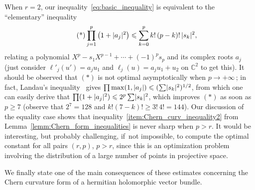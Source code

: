 \documentclass[AHL,Unicode,longabstracts,published]{cedram}
\DeclarePairedDelimiter{\abs}{\lvert}{\rvert}
\newcommand*\bC{\mathbb{C}}
\let\leq\leqslant
\let\geq\geqslant
\begin{document}
\begin{rema}
When $r=2$, our inequality~\eqref{eq:basic_inequality} is equivalent to the ``elementary'' inequality
\[
\tag{*}
\prod_{j=1}^p\left(1+\abs{a_j}^2\right)\leq \sum_{k=0}^p k!\,(p-k)!\,\abs{s_k}^2,
\]
relating a polynomial $X^p-s_1X^{p-1}+\cdots+(-1)^ps_p$ and its complex roots $a_j$ (just consider $\ell'_j(u')=a_ju_1$ and $\ell_j(u)=a_ju_1+u_2$ on $\bC^2$ to get this). It should be observed that $(*)$ is not optimal asymptotically when $p\to+\infty\,$; in fact, Landau's inequa\-lity~\cite{Land05} gives
$\prod\max(1,\abs{a_j})\leq(\sum\abs{s_k}^2)^{1/2}$, from which one can easily derive that $\prod(1+\abs{a_j}^2)\leq 2^p\sum\abs{s_k}^2$, which improves
$(*)$ as soon as $p\geq 7$ (observe that $2^7=128$ and
$k!(7-k)!\geq 3!\,4!=144$). Our discussion of the equality case shows that inequality~\eqref{item:Chern_curv_inequality2} from Lemma~\ref{lemm:Chern_form_inequalities} is never sharp when $p>r$. It would be interesting, but probably challenging, if~not impossible, to compute the optimal constant for all pairs $(r,p)$, $p>r$, since this is an optimization problem involving the distribution of a large number of points in projective space.
\end{rema}

We finally state one of the main consequences of these estimates concerning the Chern curvature form of a hermitian holomorphic vector bundle.
\end{document}
